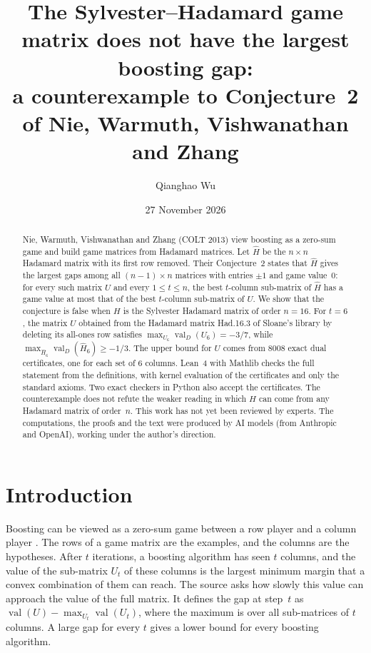 \documentclass[11pt]{article}
\title{The Sylvester--Hadamard game matrix does not have the largest boosting gap:\\
a counterexample to Conjecture~2 of Nie, Warmuth, Vishwanathan and Zhang}
\author{Qianghao Wu}
\date{27 November 2026}
\theoremstyle{remark}
\newcommand{\valD}{\operatorname{val}_D}
\newcommand{\val}{\operatorname{val}}
\newcommand{\Hh}{\hat H}
\begin{document}
\maketitle

\begin{abstract}
Nie, Warmuth, Vishwanathan and Zhang (COLT 2013) view boosting as a zero-sum game and
build game matrices from Hadamard matrices. Let $\Hh$ be the $n\times n$ Hadamard matrix
with its first row removed. Their Conjecture~2 states that $\Hh$ gives the largest gaps
among all $(n-1)\times n$ matrices with entries $\pm1$ and game value~$0$: for every such
matrix $U$ and every $1\le t\le n$, the best $t$-column sub-matrix of $\Hh$ has a game value
at most that of the best $t$-column sub-matrix of $U$. We show that the conjecture is false
when $H$ is the Sylvester Hadamard matrix of order $n=16$. For $t=6$, the matrix $U$
obtained from the Hadamard matrix Had.16.3 of Sloane's library by deleting its all-ones
row satisfies $\max_{U_6}\valD(U_6)=-3/7$, while $\max_{\Hh_6}\valD(\Hh_6)\ge-1/3$. The
upper bound for $U$ comes from 8008 exact dual certificates, one for each set of 6
columns. Lean~4 with Mathlib checks the full statement from the definitions, with kernel
evaluation of the certificates and only the standard axioms. Two exact checkers in Python
also accept the certificates. The counterexample does not refute the weaker reading in which
$\Hh$ can come from any Hadamard matrix of order~$n$. This work has not yet been reviewed by
experts. The computations, the proofs and the text were produced by AI models (from
Anthropic and OpenAI), working under the author's direction.
\end{abstract}

\section{Introduction}

Boosting can be viewed as a zero-sum game between a row player and a column player
\cite{nie2013}. The rows of a game matrix are the examples, and the columns are the
hypotheses. After $t$ iterations, a boosting algorithm has seen $t$ columns, and the value of
the sub-matrix $U_t$ of these columns is the largest minimum margin that a convex
combination of them can reach. The source \cite{nie2013} asks how slowly this value can
approach the value of the full matrix. It defines the gap at step~$t$ as
$\val(U)-\max_{U_t}\val(U_t)$, where the maximum is over all sub-matrices of $t$ columns.
A large gap for every $t$ gives a lower bound for every boosting algorithm.
\end{document}
